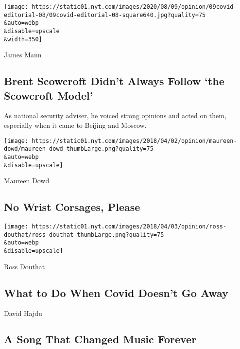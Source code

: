 \texttt{[image: https://static01.nyt.com/images/2020/08/09/opinion/09covid-editorial-08/09covid-editorial-08-square640.jpg?quality=75\\\&auto=webp\\\&disable=upscale\\\&width=350]}

\href{/2020/08/08/opinion/brent-scowcroft-model-foreign-policy.html}{}

James Mann

\hypertarget{brent-scowcroft-didnt-always-follow-the-scowcroft-model}{%
\subsection{Brent Scowcroft Didn't Always Follow `the Scowcroft
Model'}\label{brent-scowcroft-didnt-always-follow-the-scowcroft-model}}

As national security adviser, he voiced strong opinions and acted on
them, especially when it came to Beijing and Moscow.

\href{/2020/08/08/opinion/sunday/biden-vice-president-geraldine-ferraro.html}{}

\texttt{[image: https://static01.nyt.com/images/2018/04/02/opinion/maureen-dowd/maureen-dowd-thumbLarge.png?quality=75\\\&auto=webp\\\&disable=upscale]}

Maureen Dowd

\hypertarget{no-wrist-corsages-please}{%
\subsection{No Wrist Corsages, Please}\label{no-wrist-corsages-please}}

\href{/2020/08/08/opinion/sunday/covid-lyme-treatment-medicine.html}{}

\texttt{[image: https://static01.nyt.com/images/2018/04/03/opinion/ross-douthat/ross-douthat-thumbLarge.png?quality=75\\\&auto=webp\\\&disable=upscale]}

Ross Douthat

\hypertarget{what-to-do-when-covid-doesnt-go-away}{%
\subsection{What to Do When Covid Doesn't Go
Away}\label{what-to-do-when-covid-doesnt-go-away}}

\href{/2020/08/08/opinion/sunday/crazy-blues-mamie-smith.html}{}

David Hajdu

\hypertarget{a-song-that-changed-music-forever}{%
\subsection{A Song That Changed Music
Forever}\label{a-song-that-changed-music-forever}}


